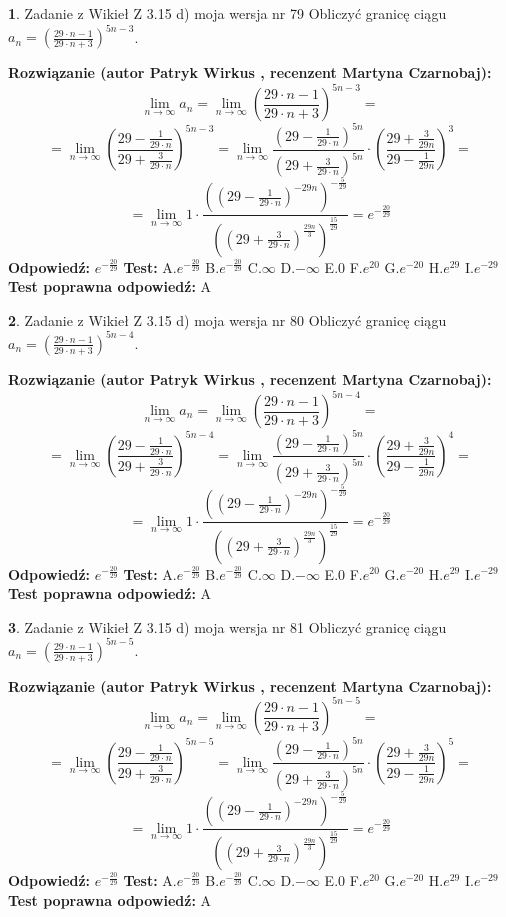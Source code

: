 \documentclass[12pt, a4paper]{article}
\theoremstyle{definition} %
\newtheorem{zad}{}
\newcommand{\zadStart}[1]{\begin{zad}#1\newline}
\newcommand{\zadStop}{\end{zad}}
\newcommand{\rozwStart}[2]{\noindent \textbf{Rozwiązanie (autor #1 , recenzent #2): }\newline}
\newcommand{\rozwStop}{\newline}
\newcommand{\odpStart}{\noindent \textbf{Odpowiedź:}\newline}
\newcommand{\odpStop}{\newline}
\newcommand{\testStart}{\noindent \textbf{Test:}\newline}
\newcommand{\testStop}{\newline}
\newcommand{\kluczStart}{\noindent \textbf{Test poprawna odpowiedź:}\newline}
\newcommand{\kluczStop}{\newline}
\begin{document}
\zadStart{Zadanie z Wikieł Z 3.15 d) moja wersja nr 79}
Obliczyć granicę ciągu $a_{n}=(\frac{29\cdot n - 1}{29 \cdot n + 3})^{5n-3}$.
\zadStop
\rozwStart{Patryk Wirkus}{Martyna Czarnobaj}
$$\lim\limits_{n\to\infty} a_{n} = \lim\limits_{n\to\infty}(\frac{29\cdot n - 1}{29 \cdot n + 3})^{5n-3}=$$
$$=\lim\limits_{n\to\infty}(\frac{29 - \frac{1}{29\cdot n}}{29 + \frac{3}{29 \cdot n}})^{5n-3}=\lim\limits_{n\to\infty}\frac{(29 - \frac{1}{29\cdot n})^{5n}}{(29 + \frac{3}{29\cdot n})^{5n}} \cdot (\frac{29+\frac{3}{29n}}{29-\frac{1}{29n}})^{3}=$$
$$=\lim\limits_{n\to\infty} 1 \cdot \frac{((29-\frac{1}{29 \cdot n})^{-29n})^{-\frac{5}{29}}}{((29+\frac{3}{29 \cdot n})^{\frac{29n}{3}})^{\frac{15}{29}}} =e^{-\frac{20}{29}}$$
\rozwStop
\odpStart
$e^{-\frac{20}{29}}$
\odpStop
\testStart
A.$ e^{-\frac{20}{29}}$
B.$ e^{-\frac{20}{29}}$
C.$\infty$
D.$-\infty$
E.$0$
F.$e^{20}$
G.$e^{-20}$
H.$e^{29}$
I.$e^{-29}$
\testStop
\kluczStart
A
\kluczStop



\zadStart{Zadanie z Wikieł Z 3.15 d) moja wersja nr 80}
Obliczyć granicę ciągu $a_{n}=(\frac{29\cdot n - 1}{29 \cdot n + 3})^{5n-4}$.
\zadStop
\rozwStart{Patryk Wirkus}{Martyna Czarnobaj}
$$\lim\limits_{n\to\infty} a_{n} = \lim\limits_{n\to\infty}(\frac{29\cdot n - 1}{29 \cdot n + 3})^{5n-4}=$$
$$=\lim\limits_{n\to\infty}(\frac{29 - \frac{1}{29\cdot n}}{29 + \frac{3}{29 \cdot n}})^{5n-4}=\lim\limits_{n\to\infty}\frac{(29 - \frac{1}{29\cdot n})^{5n}}{(29 + \frac{3}{29\cdot n})^{5n}} \cdot (\frac{29+\frac{3}{29n}}{29-\frac{1}{29n}})^{4}=$$
$$=\lim\limits_{n\to\infty} 1 \cdot \frac{((29-\frac{1}{29 \cdot n})^{-29n})^{-\frac{5}{29}}}{((29+\frac{3}{29 \cdot n})^{\frac{29n}{3}})^{\frac{15}{29}}} =e^{-\frac{20}{29}}$$
\rozwStop
\odpStart
$e^{-\frac{20}{29}}$
\odpStop
\testStart
A.$ e^{-\frac{20}{29}}$
B.$ e^{-\frac{20}{29}}$
C.$\infty$
D.$-\infty$
E.$0$
F.$e^{20}$
G.$e^{-20}$
H.$e^{29}$
I.$e^{-29}$
\testStop
\kluczStart
A
\kluczStop



\zadStart{Zadanie z Wikieł Z 3.15 d) moja wersja nr 81}
Obliczyć granicę ciągu $a_{n}=(\frac{29\cdot n - 1}{29 \cdot n + 3})^{5n-5}$.
\zadStop
\rozwStart{Patryk Wirkus}{Martyna Czarnobaj}
$$\lim\limits_{n\to\infty} a_{n} = \lim\limits_{n\to\infty}(\frac{29\cdot n - 1}{29 \cdot n + 3})^{5n-5}=$$
$$=\lim\limits_{n\to\infty}(\frac{29 - \frac{1}{29\cdot n}}{29 + \frac{3}{29 \cdot n}})^{5n-5}=\lim\limits_{n\to\infty}\frac{(29 - \frac{1}{29\cdot n})^{5n}}{(29 + \frac{3}{29\cdot n})^{5n}} \cdot (\frac{29+\frac{3}{29n}}{29-\frac{1}{29n}})^{5}=$$
$$=\lim\limits_{n\to\infty} 1 \cdot \frac{((29-\frac{1}{29 \cdot n})^{-29n})^{-\frac{5}{29}}}{((29+\frac{3}{29 \cdot n})^{\frac{29n}{3}})^{\frac{15}{29}}} =e^{-\frac{20}{29}}$$
\rozwStop
\odpStart
$e^{-\frac{20}{29}}$
\odpStop
\testStart
A.$ e^{-\frac{20}{29}}$
B.$ e^{-\frac{20}{29}}$
C.$\infty$
D.$-\infty$
E.$0$
F.$e^{20}$
G.$e^{-20}$
H.$e^{29}$
I.$e^{-29}$
\testStop
\kluczStart
A
\kluczStop
\end{document}
